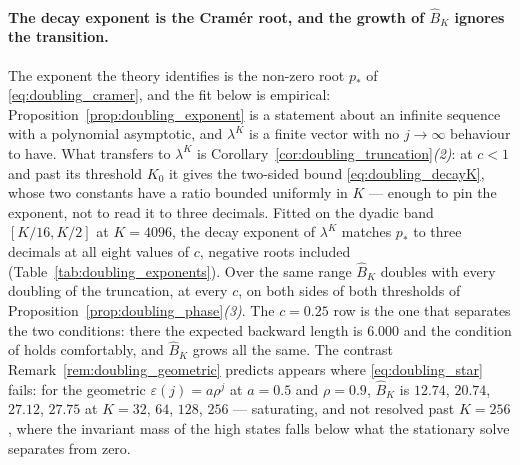 \paragraph{The decay exponent is the Cram\'er root, and the growth of $\widehat B_K$ ignores
the transition.}
The exponent the theory identifies is the non-zero root $p_*$ of \eqref{eq:doubling_cramer},
and the fit below is empirical: Proposition~\ref{prop:doubling_exponent} is a statement about
an infinite sequence with a polynomial asymptotic, and $\lambda^K$ is a finite vector with no
$j\rightarrow\infty$ behaviour to have. What transfers to $\lambda^K$ is
Corollary~\ref{cor:doubling_truncation}\emph{(2)}: at $c<1$ and past its threshold $K_0$ it
gives the two-sided bound \eqref{eq:doubling_decayK}, whose two constants have a ratio bounded
uniformly in $K$ --- enough to pin the exponent, not to read it to three decimals. Fitted on the dyadic
band $[K/16,K/2]$ at $K=4096$, the decay exponent of $\lambda^K$ matches $p_*$ to three
decimals at all eight values of $c$, negative roots included
(Table~\ref{tab:doubling_exponents}). Over the same
range $\widehat B_K$ doubles with every doubling of the truncation, at every $c$, on both
sides of both thresholds of
Proposition~\ref{prop:doubling_phase}\emph{(3)}. The $c=0.25$ row is the one that separates
the two conditions: there the expected backward length is $6.000$ and the condition of
\citet{morozov2025revisiting} holds comfortably, and $\widehat B_K$ grows all the same. The
contrast Remark~\ref{rem:doubling_geometric} predicts appears where \eqref{eq:doubling_star}
fails: for the geometric $\varepsilon(j)=a\rho^j$ at $a=0.5$ and $\rho=0.9$, $\widehat B_K$ is
$12.74$, $20.74$, $27.12$, $27.75$ at $K=32$, $64$, $128$, $256$ --- saturating, and not
resolved past $K=256$, where the invariant mass of the high states falls below what the
stationary solve separates from zero.


